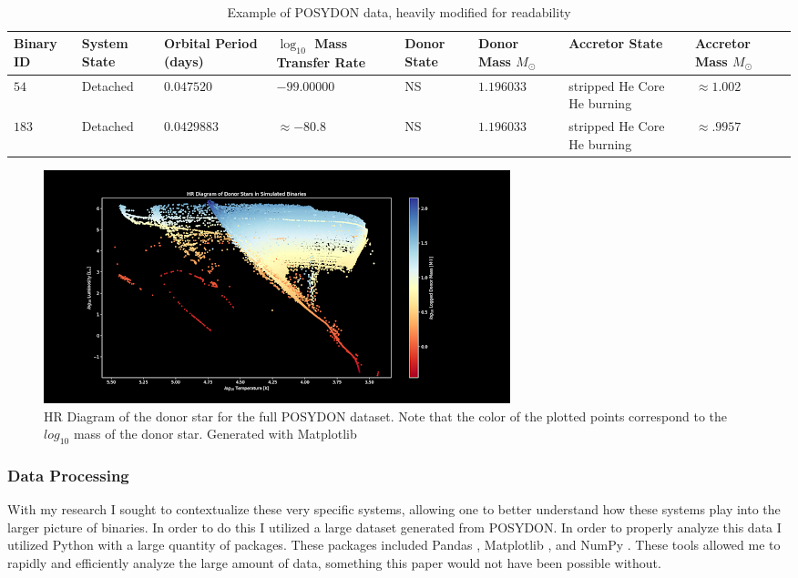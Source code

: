 \documentclass[12pt, letterpaper]{article}
\begin{document}
         \begin{table}
            \centering\
            \footnotesize
            \begin{tabularx}{\textwidth}{||X | X | X | X | X | X | X | X ||}
                \hline
                \textbf{Binary ID} & 
                \textbf{System State} & 
                \textbf{Orbital Period (days)} & 
                \boldmath$\log_{10}$ \textbf{Mass Transfer Rate} & 
                \textbf{Donor State} & 
                \textbf{Donor Mass} $M_\odot$ & 
                \textbf{Accretor State} & 
                \textbf{Accretor Mass} $M_\odot$
                \\ \hline
                $54$ & Detached & $0.047520$ & $-99.00000$ & NS & $1.196033$ & stripped He Core He burning & $\approx 1.002$ \\
                \hline
                $183$ & Detached & $0.0429883$ & $ \approx -80.8$ & NS & $1.196033$ & stripped He Core He burning & $\approx .9957$ \\
                \hline
            \end{tabularx}
            \caption{Example of POSYDON data, heavily modified for readability}
            \label{POSYDONDataExample}
        \end{table}

        \begin{figure} [H]
            \centering
            \includegraphics[width = \textwidth]{figs/EntireDataSetHR.png}
            \caption{HR Diagram of the donor star for the full POSYDON dataset. Note that the color of the plotted points correspond to the $log_{10}$ mass of the donor star. Generated with Matplotlib}
            \label{EntireDataSetHR}
        \end{figure}
        \subsubsection{Data Processing}
            With my research I sought to contextualize these very specific systems, allowing one to better understand how these systems play into the larger picture of binaries. In order to do this I utilized a large dataset generated from POSYDON. In order to properly analyze this data I utilized Python with a large quantity of packages. These packages included Pandas \cite{reback2020pandas}, Matplotlib \cite{Matplotlib}, and NumPy \cite{harris2020array}. These tools allowed me to rapidly and efficiently analyze the large amount of data, something this paper would not have been possible without.
\end{document}
